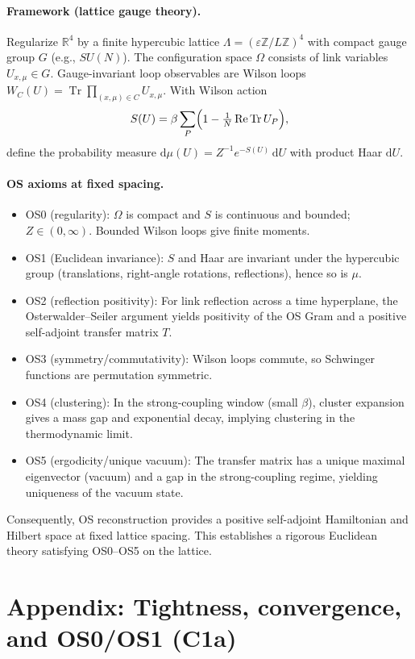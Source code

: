 \documentclass[11pt]{amsart}
\theoremstyle{plain}
\theoremstyle{definition}
\theoremstyle{remark}
\begin{document}
\paragraph{Framework (lattice gauge theory).}
Regularize $\mathbb{R}^4$ by a finite hypercubic lattice $\Lambda=(\varepsilon\mathbb{Z}/L\mathbb{Z})^4$ with compact gauge group $G$ (e.g., $SU(N)$). The configuration space $\Omega$ consists of link variables $U_{x,\mu}\in G$. Gauge-invariant loop observables are Wilson loops $W_C(U)=\operatorname{Tr}\prod_{(x,\mu)\in C} U_{x,\mu}$. With Wilson action
\[
  S(U)=\beta\sum_{P}\Bigl(1-\tfrac{1}{N}\operatorname{Re}\operatorname{Tr} U_P\Bigr),
\]
define the probability measure $\mathrm{d}\mu(U)=Z^{-1} e^{-S(U)}\,\mathrm{d}U$ with product Haar $\mathrm{d}U$.

\paragraph{OS axioms at fixed spacing.}
\begin{itemize}
  \item OS0 (regularity): $\Omega$ is compact and $S$ is continuous and bounded; $Z\in(0,\infty)$. Bounded Wilson loops give finite moments.
  \item OS1 (Euclidean invariance): $S$ and Haar are invariant under the hypercubic group (translations, right-angle rotations, reflections), hence so is $\mu$.
  \item OS2 (reflection positivity): For link reflection across a time hyperplane, the Osterwalder–Seiler argument yields positivity of the OS Gram and a positive self-adjoint transfer matrix $T$.
  \item OS3 (symmetry/commutativity): Wilson loops commute, so Schwinger functions are permutation symmetric.
  \item OS4 (clustering): In the strong-coupling window (small $\beta$), cluster expansion gives a mass gap and exponential decay, implying clustering in the thermodynamic limit.
  \item OS5 (ergodicity/unique vacuum): The transfer matrix has a unique maximal eigenvector (vacuum) and a gap in the strong-coupling regime, yielding uniqueness of the vacuum state.
\end{itemize}
Consequently, OS reconstruction provides a positive self-adjoint Hamiltonian and Hilbert space at fixed lattice spacing. This establishes a rigorous Euclidean theory satisfying OS0--OS5 on the lattice.

\section{Appendix: Tightness, convergence, and OS0/OS1 (C1a)}
\end{document}
